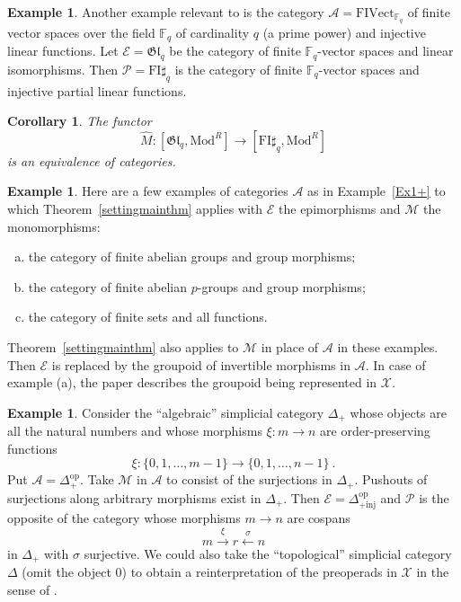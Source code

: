 \documentclass[a4paper,12pt,reqno]{amsart}
\newtheorem{corollary}[theorem]{Corollary}
\theoremstyle{definition}
\newtheorem{example}[theorem]{Example}
\theoremstyle{fact}
\theoremstyle{genquest}
\theoremstyle{step}
\newcommand{\lra}{\longrightarrow}
\newcommand{\lla}{\longleftarrow}
\def\CA{{\mathscr A}}
\def\CE{{\mathscr E}}
\def\CM{{\mathscr M}}
\def\CP{{\mathscr P}}
\def\CX{{\mathscr X}}
\begin{document}
\begin{example}
Another example relevant to \cite{repfgl} is the category $\CA = \mathrm{FIVect}_{\mathbb{F}_q}$
of finite vector spaces over the field $\mathbb{F}_q$ of cardinality 
$q$ (a prime power) and injective linear functions.
Let $\CE = \mathfrak{Gl}_q$ be the category of finite
$\mathbb{F}_q$-vector spaces and linear isomorphisms. 
Then $\CP = \mathrm{FI}\sharp_q$ is the
category of finite $\mathbb{F}_q$-vector spaces and injective 
partial linear functions.

\begin{corollary} The functor
$$\widehat{M} : [\mathfrak{Gl}_q, \mathrm{Mod}^R] \lra [\mathrm{FI}\sharp_q, \mathrm{Mod}^R]$$
is an equivalence of categories.
\end{corollary}
\end{example}   

\begin{example}
Here are a few examples of categories $\CA$ as in Example~\ref{Ex1+} to which 
Theorem~\ref{settingmainthm} applies with $\CE$ 
the epimorphisms and $\CM$ the monomorphisms:
\begin{enumerate}[(a)]
\item the category of finite abelian groups and group morphisms;
\item the category of finite abelian $p$-groups and group morphisms;
\item the category of finite sets and all functions.
\end{enumerate}
Theorem~\ref{settingmainthm} also applies to $\CM$ in place of $\CA$
in these examples. Then $\CE$ is replaced by the groupoid of
invertible morphisms in $\CA$. In case of example (a),
the paper \cite{HillarDarren2007} describes the groupoid being represented in $\CX$. 
\end{example}

\begin{example}
Consider the ``algebraic'' simplicial category $\Delta_+$ 
whose objects are all the natural numbers and 
whose morphisms $\xi : m\lra n$ are order-preserving functions 
$$\xi : \{0, 1, \dots , m-1\}\lra \{0, 1, \dots , n-1\} \ .$$
Put $\CA = \Delta_+^{\mathrm{op}}$.
Take $\CM$ in $\CA$ to consist of the surjections in $\Delta_+$.
Pushouts of surjections along arbitrary morphisms exist in 
$\Delta_+$. 
Then $\CE = \Delta_{+\mathrm{inj}}^{\mathrm{op}}$
and $\CP$ is the opposite of the category whose morphisms
$m\lra n$ are cospans $$m\stackrel{\xi}\lra r \stackrel{\sigma}\lla n$$
in $\Delta_+$ with $\sigma$ surjective. 
We could also take the ``topological'' simplicial category 
$\Delta$ (omit the object $0$) to obtain
a reinterpretation of the preoperads in $\CX$ in the sense of 
\cite{Berger1996}.
\end{example}
\end{document}
